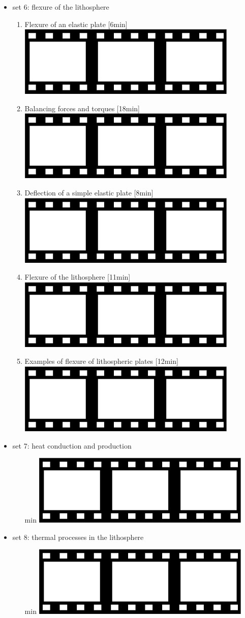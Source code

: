 \begin{itemize}
\item set 6: flexure of the lithosphere
\begin{enumerate}
\item Flexure of an elastic plate [6min] \href{https://youtu.be/WIm_g53K8B8?si=InI269vgcFNBbtYz}{\includegraphics[width=.8cm]{images/pictograms/film.png}}
\item Balancing forces and torques [18min] \href{https://youtu.be/pHmKQe7StAM?si=RwITi7foVbrmRSSm}{\includegraphics[width=.8cm]{images/pictograms/film.png}}
\item Deflection of a simple elastic plate [8min] \href{https://youtu.be/P73dYtuQ6Pg?si=U4rzWk3-LQmLoxAs}{\includegraphics[width=.8cm]{images/pictograms/film.png}}
\item Flexure of the lithosphere [11min] \href{https://youtu.be/AkFKYXNhsdY?si=I3FNUJSxqaWWenqw}{\includegraphics[width=.8cm]{images/pictograms/film.png}}
\item Examples of flexure of lithospheric plates [12min] \href{https://youtu.be/gbkaWUQKxI4?si=qLu29Px_4c03A9eh}{\includegraphics[width=.8cm]{images/pictograms/film.png}}
\end{enumerate}

\item set 7: heat conduction and production
\begin{enumerate}
\item [min] \href{}{\includegraphics[width=.8cm]{images/pictograms/film.png}}
\end{enumerate}

\item set 8: thermal processes in the lithosphere
\begin{enumerate}
\item [min] \href{}{\includegraphics[width=.8cm]{images/pictograms/film.png}}
\end{enumerate}


\end{itemize}
